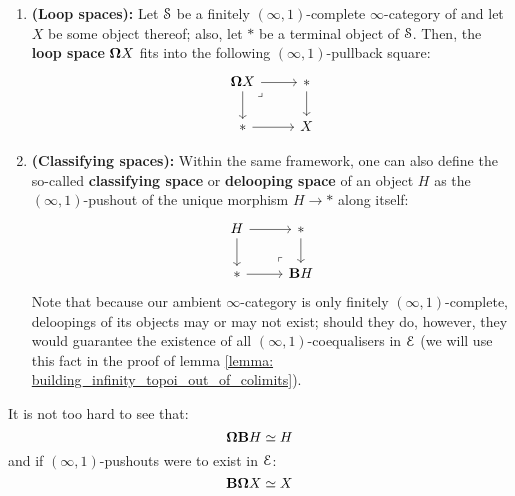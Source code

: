                 \begin{definition}[(De)looping] \label{def: looping}   
                    \noindent
                    \begin{enumerate}
                        \item \textbf{(Loop spaces):} Let $\S$ be a finitely $(\infty, 1)$-complete $\infty$-category of  and let $X$ be some object thereof; also, let $*$ be a terminal object of $\S$. Then, the \textbf{loop space} $\loopspace X$ fits into the following $(\infty, 1)$-pullback square:
                            $$
                                \begin{tikzcd}
                                	{\loopspace X} & {*} \\
                                	{*} & X
                                	\arrow[from=1-1, to=2-1]
                                	\arrow[from=2-1, to=2-2]
                                	\arrow[from=1-1, to=1-2]
                                	\arrow[from=1-2, to=2-2]
                                	\arrow["\lrcorner"{anchor=center, pos=0.125}, draw=none, from=1-1, to=2-2]
                                \end{tikzcd}
                            $$
                        \item \textbf{(Classifying spaces):} Within the same framework, one can also define the so-called \textbf{classifying space} or \textbf{delooping space} of an object $H$ as the $(\infty, 1)$-pushout of the unique morphism $H \to *$ along itself:
                            $$
                                \begin{tikzcd}
                                	H & {*} \\
                                	{*} & {\bfB H}
                                	\arrow[from=1-1, to=2-1]
                                	\arrow[from=2-1, to=2-2]
                                	\arrow[from=1-1, to=1-2]
                                	\arrow[from=1-2, to=2-2]
                                	\arrow["\lrcorner"{anchor=center, pos=0.125, rotate=180}, draw=none, from=2-2, to=1-1]
                                \end{tikzcd}
                            $$
                        Note that because our ambient $\infty$-category is only finitely $(\infty, 1)$-complete, deloopings of its objects may or may not exist; should they do, however, they would guarantee the existence of all $(\infty, 1)$-coequalisers in $\E$ (we will use this fact in the proof of lemma \ref{lemma: building_infinity_topoi_out_of_colimits}).
                    \end{enumerate}
                    It is not too hard to see that:
                        $$\loopspace \bfB H \cong H$$
                    and if $(\infty, 1)$-pushouts were to exist in $\E$:
                        $$\bfB \loopspace X \cong X$$
                \end{definition}

